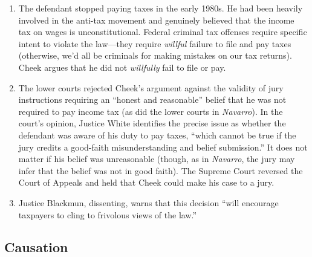 \begin{enumerate}
    \item The defendant stopped paying taxes in the early 1980s. He had been heavily involved in the anti-tax movement and genuinely believed that the income tax on wages is unconstitutional. Federal criminal tax offenses require specific intent to violate the law---they require \emph{willful} failure to file and pay taxes (otherwise, we'd all be criminals for making mistakes on our tax returns). Cheek argues that he did not \emph{willfully} fail to file or pay.
    \item The lower courts rejected Cheek's argument against the validity of jury instructions requiring an ``honest and reasonable'' belief that he was not required to pay income tax (as did the lower courts in \emph{Navarro}). In the court's opinion, Justice White identifies the precise issue as whether the defendant was aware of his duty to pay taxes, ``which cannot be true if the jury credits a good-faith misunderstanding and belief submission.'' It does not matter if his belief was unreasonable (though, as in \emph{Navarro}, the jury may infer that the belief was not in good faith). The Supreme Court reversed the Court of Appeals and held that Cheek could make his case to a jury.
    \item Justice Blackmun, dissenting, warns that this decision ``will encourage taxpayers to cling to frivolous views of the law.''
\end{enumerate}

\subsection{Causation}

